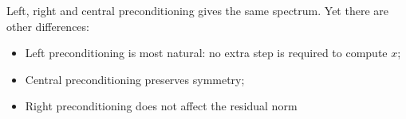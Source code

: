 \begin{frame}
  Left, right and central preconditioning gives the same spectrum.
  Yet there are other differences:
  \begin{itemize}
  \item  Left preconditioning is most natural: no extra step is
required to compute $x$;
\item Central preconditioning preserves symmetry;
\item Right preconditioning does not affect the residual norm

  \end{itemize}
\end{frame}











